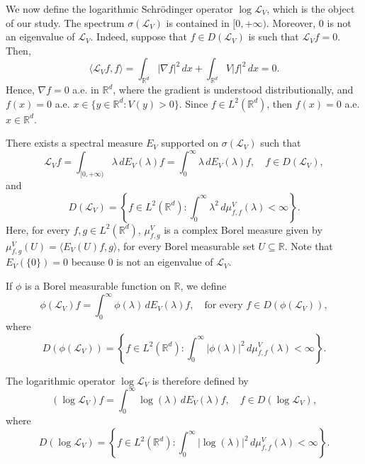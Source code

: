 \documentclass[10pt, a4paper, reqno]{amsart}
\theoremstyle{definition}
\theoremstyle{remark}
\numberwithin{equation}{section}
\begin{document}
We now define the logarithmic Schr\"odinger operator $\log \mathcal{L}_V$, which is the object of our study. The spectrum $\sigma(\mathcal{L}_V)$ is contained in $[0,+\infty)$. Moreover, $0$ is not an eigenvalue of $\mathcal{L}_V$. Indeed, suppose that $f \in D(\mathcal{L}_V)$ is such that $\mathcal{L}_V f = 0$. Then,
\begin{equation*}
    \langle \mathcal{L}_V f, f \rangle = \int_{\mathbb{R}^d} |\nabla f|^2 \, dx + \int_{\mathbb{R}^d} V |f|^2 \, dx = 0.
\end{equation*}
Hence, $\nabla f = 0$ a.e. in $\mathbb{R}^d$, where the gradient is understood distributionally, and $f(x) = 0$ a.e. \linebreak $x \in \{y \in \mathbb{R}^d : V(y) > 0\}$. Since $f \in L^2(\mathbb{R}^d)$, then $f(x) = 0$ a.e. $x \in \mathbb{R}^d$.

There exists a spectral measure $E_V$ supported on $\sigma(\mathcal{L}_V)$ such that 
\begin{equation*}
    \mathcal{L}_V f = \int_{[0,+\infty)} \lambda \, dE_V(\lambda) f = \int_0^{\infty} \lambda \, dE_V(\lambda) f, \quad f \in D(\mathcal{L}_V), 
\end{equation*}
and 
\begin{equation*}
    D(\mathcal{L}_V) = \left\{ 
    f \in L^2(\mathbb{R}^d) : \int_{0}^\infty \lambda^2 \, d\mu_{f,f}^V(\lambda) < \infty \right\}.
\end{equation*}
Here, for every $f, g \in L^2(\mathbb{R}^d)$, $\mu_{f,g}^V$ is a complex Borel measure given by $\mu_{f,g}^V(U) = \langle E_V(U) f, g \rangle$, for every Borel measurable set $U \subseteq \mathbb{R}$. Note that $E_V(\{0\}) = 0$ because $0$ is not an eigenvalue of $\mathcal{L}_V$.

If $\phi$ is a Borel measurable function on $\mathbb{R}$, we define
\begin{equation*}
    \phi(\mathcal{L}_V) f = \int_0^\infty \phi(\lambda) \, dE_V(\lambda) f, \quad \text{for every } f \in D(\phi(\mathcal{L}_V)),
\end{equation*}
where 
\begin{equation*}
    D(\phi(\mathcal{L}_V)) = \left\{ 
    f \in L^2(\mathbb{R}^d) : \int_{0}^\infty |\phi(\lambda)|^2 \, d\mu_{f,f}^V(\lambda) < \infty \right\}.
\end{equation*}


The logarithmic operator $\log \mathcal{L}_V$ is therefore defined by
\[
(\log \mathcal{L}_V) f = \int_0^\infty \log(\lambda) \, dE_V(\lambda) f, \quad f \in D(\log \mathcal{L}_V),
\]
where
\begin{equation*}
    D(\log \mathcal{L}_V) = \left\{ 
    f \in L^2(\mathbb{R}^d) : \int_{0}^\infty |\log(\lambda)|^2 \, d\mu_{f,f}^V(\lambda) < \infty \right\}.
\end{equation*}
\end{document}
